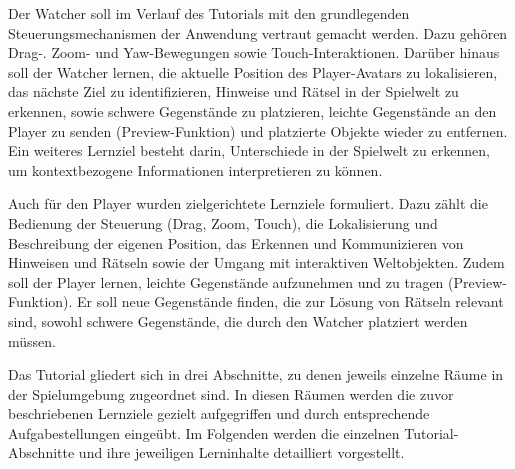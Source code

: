 Der Watcher soll im Verlauf des Tutorials mit den grundlegenden Steuerungsmechanismen der Anwendung vertraut gemacht werden. Dazu gehören Drag-. Zoom- und Yaw-Bewegungen sowie Touch-Interaktionen. Darüber hinaus soll der Watcher lernen, die aktuelle Position des Player-Avatars zu lokalisieren, das nächste Ziel zu identifizieren, Hinweise und Rätsel in der Spielwelt zu erkennen, sowie schwere Gegenstände zu platzieren, leichte Gegenstände an den Player zu senden (Preview-Funktion) und platzierte Objekte wieder zu entfernen. Ein weiteres Lernziel besteht darin, Unterschiede in der Spielwelt zu erkennen, um kontextbezogene Informationen interpretieren zu können.

Auch für den Player wurden zielgerichtete Lernziele formuliert. Dazu zählt die Bedienung der Steuerung (Drag, Zoom, Touch), die Lokalisierung und Beschreibung der eigenen Position, das Erkennen und Kommunizieren von Hinweisen und Rätseln sowie der Umgang mit interaktiven Weltobjekten. Zudem soll der Player lernen, leichte Gegenstände aufzunehmen und zu tragen (Preview-Funktion). Er soll neue Gegenstände finden, die zur Lösung von Rätseln relevant sind, sowohl schwere Gegenstände, die durch den Watcher platziert werden müssen.

Das Tutorial gliedert sich in drei Abschnitte, zu denen jeweils einzelne Räume in der Spielumgebung zugeordnet sind. In diesen Räumen werden die zuvor beschriebenen Lernziele gezielt aufgegriffen und durch entsprechende Aufgabestellungen eingeübt. Im Folgenden werden die einzelnen Tutorial-Abschnitte und ihre jeweiligen Lerninhalte detailliert vorgestellt.


